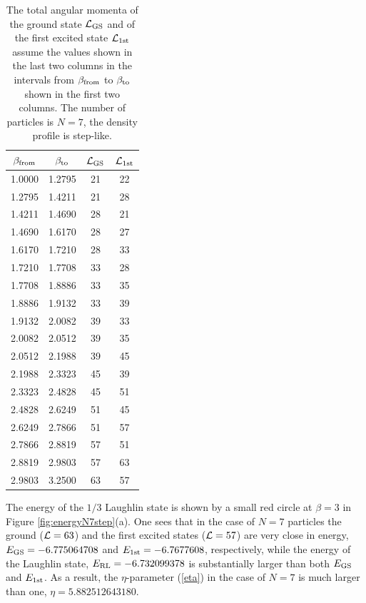 \documentclass[aps,prb,10pt%
]{revtex4-2}
\begin{document}
\begin{table}[!ht]
\caption{The total angular momenta of the ground state ${\cal L}_{\rm GS}$ and of the first excited state ${\cal L}_{\rm 1st}$ assume the values shown in the last two columns in the intervals from $\beta_{\rm from}$ to $\beta_{\rm to}$ shown in the first two columns. The number of particles is  $N=7$, the density profile is step-like. \label{tab:N7LtotGS1st}}
\begin{tabular}{cccc}
$\beta_{\rm from}$ & $\beta_{\rm to}$   & ${\cal L}_{\rm GS}$   & ${\cal L}_{\rm 1st}$\\
\hline
1.0000	& 1.2795	& 21	& 22 \\
1.2795	& 1.4211	& 21	& 28 \\
1.4211	& 1.4690	& 28	& 21 \\
1.4690	& 1.6170	& 28	& 27 \\
1.6170	& 1.7210	& 28	& 33 \\
1.7210	& 1.7708	& 33	& 28 \\
1.7708	& 1.8886	& 33	& 35 \\
1.8886	& 1.9132	& 33	& 39 \\
1.9132	& 2.0082	& 39	& 33 \\
2.0082	& 2.0512	& 39	& 35 \\
2.0512	& 2.1988	& 39	& 45 \\
2.1988	& 2.3323	& 45	& 39 \\
2.3323	& 2.4828	& 45	& 51 \\
2.4828	& 2.6249	& 51	& 45 \\
2.6249	& 2.7866	& 51	& 57 \\
2.7866	& 2.8819	& 57	& 51 \\
2.8819	& 2.9803	& 57	& 63 \\
2.9803	& 3.2500	& 63	& 57 \\
\end{tabular}
\end{table}

The energy of the $1/3$ Laughlin state is shown by a small red circle at $\beta=3$ in Figure \ref{fig:energyN7step}(a). One sees that in the case of $N=7$ particles the ground (${\cal L}=63$) and the first excited states (${\cal L}=57$) are very close in energy, $E_{\rm GS}=-6.775064708$ and $E_{\rm 1st}=
-6.7677608$, respectively, while the energy of the Laughlin state, $E_{\rm RL}=-6.732099378$ is substantially larger than both $E_{\rm GS}$ and $E_{\rm 1st}$. As a result, the $\eta$-parameter (\ref{eta}) in the case of $N=7$ is much larger than one, $\eta=5.882512643180$.
\end{document}
